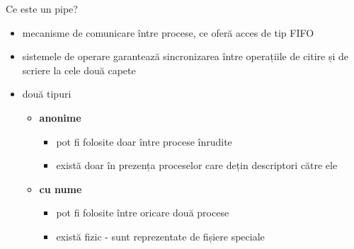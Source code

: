 \documentclass{so.cs.pub.ro}
\begin{document}
\begin{frame}{Ce este un pipe?}
	\begin{itemize}
		\item mecanisme de comunicare între procese, ce oferă acces de tip FIFO
		\vspace*{0.1cm}
		\item sistemele de operare garantează sincronizarea între operațiile de citire și de scriere la cele două capete
		\vspace*{0.1cm}
		\item două tipuri
		\begin{itemize}
			\item \textbf{anonime}		
			\begin{itemize}
				\item pot fi folosite doar între procese înrudite
				\item există doar în prezența proceselor care dețin descriptori către ele
			\end{itemize}
			\item \textbf{cu nume}
			\begin{itemize}
				\item pot fi folosite între oricare două procese
				\item există fizic - sunt reprezentate de fișiere speciale
			\end{itemize}
		\end{itemize}
	\end{itemize}
\end{frame}
\end{document}
